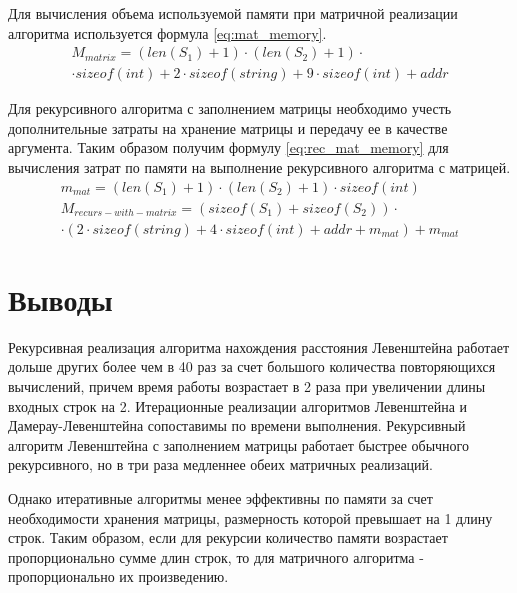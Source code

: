 \documentclass[a4paper,oneside,14pt]{extreport}
\begin{document}
Для вычисления объема используемой памяти при матричной реализации алгоритма используется формула \ref{eq:mat_memory}.
\begin{equation} \label{eq:mat_memory}
	\begin{array}{ll}
	M_{matrix} = (len(S_{1}) + 1) \cdot (len(S_{2}) + 1) \cdot \\
	\cdot sizeof(int) + 2 \cdot sizeof(string) + 9 \cdot sizeof(int) + addr
	\end{array}
\end{equation}

Для рекурсивного алгоритма с заполнением матрицы необходимо учесть дополнительные затраты на хранение матрицы и передачу ее в качестве аргумента. Таким образом получим формулу \ref{eq:rec_mat_memory} для вычисления затрат по памяти на выполнение рекурсивного алгоритма с матрицей.
\begin{equation} \label{eq:rec_mat_memory}
	\begin{array}{ll}
	m_{mat} = (len(S_{1}) + 1) \cdot (len(S_{2}) + 1) \cdot sizeof(int)\\
	M_{recurs-with-matrix} = (sizeof(S_{1}) + sizeof(S_{2})) \cdot \\
	\cdot (2 \cdot sizeof(string) + 4 \cdot sizeof(int) + addr + m_{mat}) + m_{mat}
	\end{array}
\end{equation}

\section{Выводы}

Рекурсивная реализация алгоритма нахождения расстояния Левенштейна работает дольше других более чем в 40 раз за счет большого количества повторяющихся вычислений, причем время работы возрастает в 2 раза при увеличении длины входных строк на 2. Итерационные реализации алгоритмов Левенштейна и Дамерау-Левенштейна сопоставимы по времени выполнения. Рекурсивный алгоритм Левенштейна с заполнением матрицы работает быстрее обычного рекурсивного, но в три раза медленнее обеих матричных реализаций.

Однако итеративные алгоритмы менее эффективны по памяти за счет необходимости хранения матрицы, размерность которой превышает на 1 длину строк. Таким образом, если для рекурсии количество памяти возрастает пропорционально сумме длин строк, то для матричного алгоритма - пропорционально их произведению.
\newpage

\end{document}
